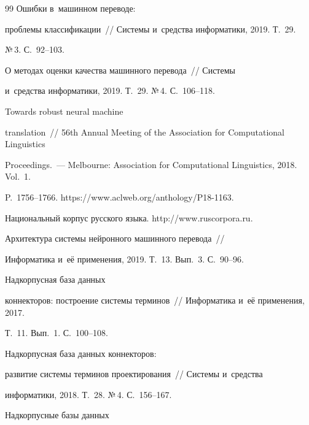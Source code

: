 {{\begin{thebibliography}{99}
 Ошибки в~машинном переводе: 


проблемы классификации~/\!\!/ Системы и~средства информатики, 2019. Т.~29. 


№\,3. С.~92--103.




 О методах оценки качества машинного перевода~/\!\!/ Системы 


и~средства информатики, 2019. Т.~29. №\,4. С.~106--118.




 Towards robust neural machine 


translation~/\!\!/ 56th Annual Meeting of the Association for Computational Linguistics 


Proceedings.~--- Melbourne: Association for Computational Linguistics, 2018. Vol.~1. 


P.~1756--1766. {\sf https://www.aclweb.org/anthology/P18-1163}.




Национальный корпус русского языка. {\sf http://www.ruscorpora.ru}.




 Архитектура системы нейронного машинного перевода~/\!\!/ 


Информатика и~её применения, 2019. Т.~13. Вып.~3. С.~90--96.




 Надкорпусная база данных 


коннекторов: построение системы терминов~/\!\!/ Информатика и~её применения, 2017. 


Т.~11. Вып.~1. С.~100--108.







 Надкорпусная база данных коннекторов: 


развитие системы терминов проектирования~/\!\!/ Системы и~средства 


информатики, 2018. Т.~28. №\,4. С.~156--167.







 Надкорпусные базы данных 



\end{thebibliography}}}
